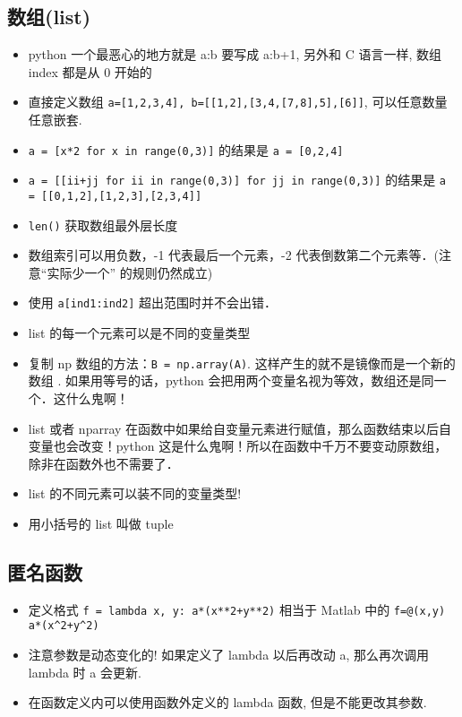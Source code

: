 \subsection{数组(list)}
\begin{itemize}
\item python 一个最恶心的地方就是 a:b 要写成 a:b+1, 另外和 C 语言一样, 数组 index 都是从 0 开始的
\item 直接定义数组 \verb`a=[1,2,3,4], b=[[1,2],[3,4,[7,8],5],[6]]`, 可以任意数量任意嵌套.
\item \verb`a = [x*2 for x in range(0,3)]` 的结果是 \verb`a = [0,2,4]`
\item \verb`a = [[ii+jj for ii in range(0,3)] for jj in range(0,3)]` 的结果是 \verb`a = [[0,1,2],[1,2,3],[2,3,4]]`
\item \verb`len()` 获取数组最外层长度
\item 数组索引可以用负数，-1 代表最后一个元素，-2 代表倒数第二个元素等．(注意“实际少一个” 的规则仍然成立)
\item 使用 \verb`a[ind1:ind2]` 超出范围时并不会出错．
\item list 的每一个元素可以是不同的变量类型
\item 复制 np 数组的方法：\verb`B = np.array(A)`. 这样产生的就不是镜像而是一个新的数组 . 如果用等号的话，python 会把用两个变量名视为等效，数组还是同一个．这什么鬼啊！
\item list 或者 nparray 在函数中如果给自变量元素进行赋值，那么函数结束以后自变量也会改变！python 这是什么鬼啊！所以在函数中千万不要变动原数组，除非在函数外也不需要了．
\item list 的不同元素可以装不同的变量类型!
\item 用小括号的 list 叫做 tuple
\end{itemize}

\subsection{匿名函数}
\begin{itemize}
\item 定义格式 \verb`f = lambda x, y: a*(x**2+y**2)` 相当于 Matlab 中的 \verb`f=@(x,y) a*(x^2+y^2)`
\item 注意参数是动态变化的! 如果定义了 lambda 以后再改动 a, 那么再次调用 lambda 时 a 会更新.
\item 在函数定义内可以使用函数外定义的 lambda 函数, 但是不能更改其参数.
\end{itemize}

